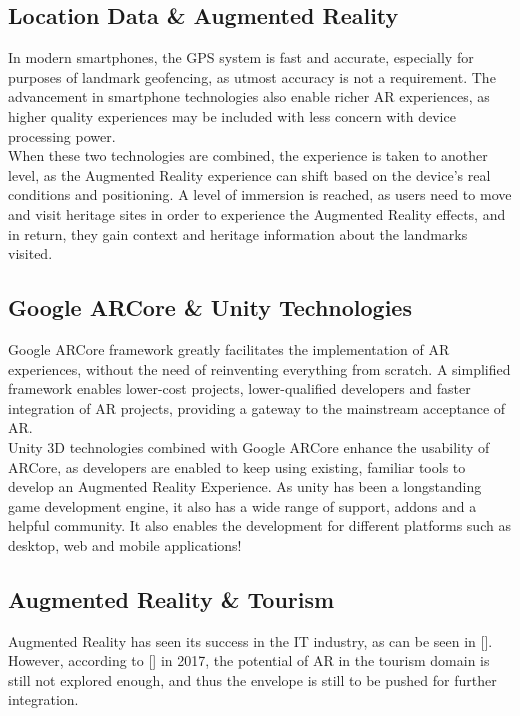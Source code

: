 \subsection{Location Data \&  Augmented Reality}
In modern smartphones, the GPS system is fast and accurate, especially for purposes of landmark geofencing, 
as utmost accuracy is not a requirement. The advancement in smartphone technologies also enable richer AR experiences, as higher quality 
experiences may be included with less concern with device processing power.\\
When these two technologies are combined, the experience is taken to another level, as the Augmented Reality experience can shift based on 
the device's real conditions and positioning. A level of immersion is reached, as users need to move and visit heritage sites in 
order to experience the Augmented Reality effects, and in return, they gain context and heritage information about the landmarks visited.   
\subsection{Google ARCore \& Unity Technologies}
Google ARCore framework greatly facilitates the implementation of AR experiences, without the need of reinventing everything from scratch. 
A simplified framework enables lower-cost projects, lower-qualified developers and faster integration of AR projects, 
providing a gateway to the mainstream acceptance of AR.\\
Unity 3D technologies combined with Google ARCore enhance the usability of ARCore, as developers are enabled to keep using existing, 
familiar tools to develop an Augmented Reality Experience. As unity has been a longstanding game development engine, it also has a wide range of support, 
addons and a helpful community. It also enables the development for different platforms such as desktop, web and mobile applications!
\subsection{Augmented Reality \& Tourism}
Augmented Reality has seen its success in the IT industry, as can be seen in []. However, according to [] in 2017, the potential of AR
in the tourism domain is still not explored enough, and thus the envelope is still to be pushed for further integration.